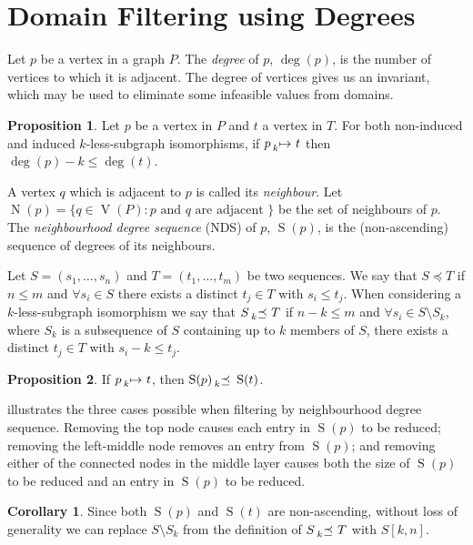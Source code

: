 \documentclass[letterpaper]{article}
\theoremstyle{definition}
\newtheorem{proposition}{Proposition}
\newtheorem{corollary}{Corollary}
\newcommand{\lessmap}[1]{\prescript{}{#1}{\mapsto}\ }
\newcommand{\lesspreceq}[1]{\prescript{}{#1}{\preceq}\ }
\newcommand{\V}{\operatorname{V}}
\newcommand{\N}{\operatorname{N}}
\newcommand{\nds}{\operatorname{S}}
\begin{document}
\section{Domain Filtering using Degrees}\label{section:degreefiltering}

Let $p$ be a vertex in a graph $P$. The \emph{degree} of $p$, $\deg(p)$, is the number of vertices
to which it is adjacent. The degree of vertices gives us an invariant, which may be used to
eliminate some infeasible values from domains.

\begin{proposition}
    \label{prop:deg}
    Let $p$ be a vertex in $P$ and $t$ a vertex in $T$. For both non-induced and induced
    $k$-less-subgraph isomorphisms, if $p \lessmap{k} t$ then
    $\deg(p) - k \le \deg(t)$.
\end{proposition}

A vertex $q$ which is adjacent to $p$ is called its \emph{neighbour}.  Let $\N(p) = \{ q \in \V(P) :
 p \text{ and } q \text{ are adjacent }\}$ be the set of neighbours of $p$.  The \emph{neighbourhood
degree sequence} (NDS) of $p$, $\nds(p)$, is the (non-ascending) sequence of degrees of its
neighbours.

Let $S = ( s_1 , \ldots , s_n )$ and $T = ( t_1 , \ldots , t_m)$ be two sequences.  We say that $S
\preceq T$ if $n \leq m$ and $\forall s_i \in S$ there exists a distinct $t_j \in T$ with $s_i \leq
t_j$.  When considering a $k$-less-subgraph isomorphism we say that $S \lesspreceq{k}
T$ if $n - k \leq m$ and $\forall s_i \in S \setminus S_k$, where $S_k$ is a subsequence of $S$
containing up to $k$ members of $S$, there exists a distinct $t_j \in T$ with $s_i - k \leq t_j$.


\begin{proposition}\label{prop:nds}
If $p \lessmap{k} t$, then $\nds(p) \lesspreceq{k} \nds(t)$.
\end{proposition}

 illustrates the three cases possible when filtering by neighbourhood degree
sequence.  Removing the top node causes each entry in $\nds(p)$ to be reduced; removing the
left-middle node removes an entry from $\nds(p)$; and removing either of the connected nodes in the
middle layer causes both the size of $\nds(p)$ to be reduced and an entry in $\nds(p)$ to be reduced.

\begin{corollary}
Since both $\nds(p)$ and $\nds(t)$ are non-ascending, without loss of generality we can replace
$S \setminus S_k$ from the definition of $S \lesspreceq{k} T$ with $S[k, n]$.
\end{corollary}
\end{document}
